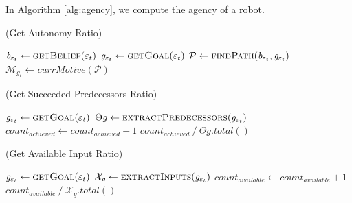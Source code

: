 \documentclass[letterpaper]{article}
\begin{document}
In Algorithm \ref{alg:agency}, we compute the agency of a robot.

\begin{algorithm}
	\caption{(Get Autonomy Ratio)}
	\label{alg:autonomy}
	\begin{algorithmic}[1]
			\Statex
			\State $\mathit{b}_{\varepsilon_t} \gets \Call{getBelief}{\varepsilon_t}$
			\State $\mathit{g}_{\varepsilon_t} \gets \Call{getGoal}{\varepsilon_t}$
			\Statex
			\State $\mathcal{P} \gets \Call{findPath}{\mathit{b}_{\varepsilon_t},
			\mathit{g}_{\varepsilon_t}}$
			\Statex
				\State $\mathcal{M}_{\mathit{g}_{t}} \gets
				\textit{currMotive}{(\mathcal{P})}$
					 \State {}
					\Else
						\State {}
					\EndIf
				\Else
					\State {}
				\EndIf
			\EndIf
		\EndFunction 
	\end{algorithmic}
\end{algorithm}

\begin{algorithm}
	\caption{(Get Succeeded Predecessors Ratio)}
	\label{alg:predecessors}
	\begin{algorithmic}[1]
			\Statex
			\State $\mathit{g}_{\varepsilon_t} \gets \Call{getGoal}{\varepsilon_t}$
			\Statex
				\State {}
			\EndIf
			\Statex
			\State $\Theta{\mathit{g}} \gets
			\Call{extractPredecessors}{\mathit{g}_{\varepsilon_t}}$
			\Statex
					\State $count_{achieved} \gets count_{achieved} + 1$
				\EndIf
			\EndFor
			\Statex
			\State \Return
			${count_{achieved} \mathbin{/} {\Theta{\mathit{g}}.total()}}$
		\EndFunction 
	\end{algorithmic}
\end{algorithm}

\begin{algorithm}
	\caption{(Get Available Input Ratio)}
	\label{alg:inputs}
	\begin{algorithmic}[1]
			\Statex
			\State $\mathit{g}_{\varepsilon_t} \gets \Call{getGoal}{\varepsilon_t}$
			\Statex
				\State {}
			\EndIf
			\Statex
			\State $\mathcal{X}_{\mathit{g}} \gets
			\Call{extractInputs}{\mathit{g}_{\varepsilon_t}}$
			\Statex
					\State $count_{available} \gets count_{available} + 1$
				\EndIf
			\EndFor
			\Statex
			\State \Return
			${count_{available} \mathbin{/} \mathcal{X}_{\mathit{g}}.total()}$
		\EndFunction 
	\end{algorithmic}
\end{algorithm}
\end{document}
